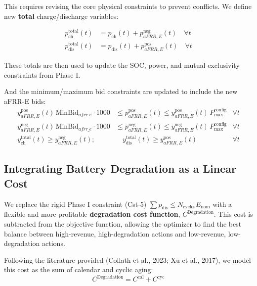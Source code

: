 \documentclass[11pt, a4paper]{article}
\begin{document}
This requires revising the core physical constraints to prevent conflicts. We define new \textbf{total} charge/discharge variables:

\begin{align}
p^{\mathrm{total}}_{\mathrm{ch}}(t) &= p_{\mathrm{ch}}(t) + p^{\mathrm{neg}}_{aFRR,E}(t) \quad \forall t \\
p^{\mathrm{total}}_{\mathrm{dis}}(t) &= p_{\mathrm{dis}}(t) + p^{\mathrm{pos}}_{aFRR,E}(t) \quad \forall t 
\end{align}

These totals are then used to update the SOC, power, and mutual exclusivity constraints from Phase I.

And the minimum/maximum bid constraints are updated to include the new aFRR-E bids:
\begin{align}
    y^{\mathrm{pos}}_{aFRR,E}(t)\,\text{MinBid}_{afrr\_e} \cdot 1000 &\le p^{\mathrm{pos}}_{aFRR,E}(t) \le y^{\mathrm{pos}}_{aFRR,E}(t)\,P^{\mathrm{config}}_{\max} & \forall t \\
    y^{\mathrm{neg}}_{aFRR,E}(t)\,\text{MinBid}_{afrr\_e} \cdot 1000 &\le p^{\mathrm{neg}}_{aFRR,E}(t) \le y^{\mathrm{neg}}_{aFRR,E}(t)\,P^{\mathrm{config}}_{\max} & \forall t \\
    y^{\mathrm{total}}_{\mathrm{ch}}(t) \ge y^{\mathrm{neg}}_{aFRR,E}(t); \quad & \quad y^{\mathrm{total}}_{\mathrm{dis}}(t) \ge y^{\mathrm{pos}}_{aFRR,E}(t) & \forall t
\end{align}

\subsection*{Integrating Battery Degradation as a Linear Cost}
We replace the rigid Phase I constraint (Cst-5) $\sum p_{\mathrm{dis}} \le N_{\mathrm{cycles}} E_{\mathrm{nom}}$ with a flexible and more profitable \textbf{degradation cost function}, $C^{\mathrm{Degradation}}$. This cost is subtracted from the objective function, allowing the optimizer to find the best balance between high-revenue, high-degradation actions and low-revenue, low-degradation actions.

Following the literature provided (Collath et al., 2023; Xu et al., 2017), we model this cost as the sum of calendar and cyclic aging:
$$ C^{\mathrm{Degradation}} = C^{\mathrm{cal}} + C^{\mathrm{cyc}} $$
\end{document}
